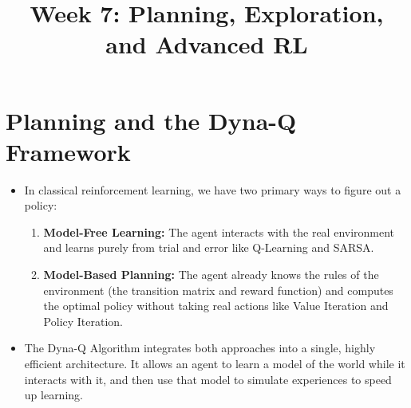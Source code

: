 \documentclass[12pt]{article}
\title{\textbf{Week 7: Planning, Exploration, and Advanced RL}}
\author{}
\date{}
\begin{document}
\maketitle

\vspace{0.5cm}

\section*{Planning and the Dyna-Q Framework}
\begin{itemize}[label=$\bullet$]
    \item In classical reinforcement learning, we have two primary ways to figure out a policy:
    \begin{enumerate}
        \item \textbf{Model-Free Learning:} The agent interacts with the real environment and learns purely from trial and error like Q-Learning and SARSA.
        \item \textbf{Model-Based Planning:} The agent already knows the rules of the environment (the transition matrix and reward function) and computes the optimal policy without taking real actions like Value Iteration and Policy Iteration.
    \end{enumerate}
    \item The Dyna-Q Algorithm integrates both approaches into a single, highly efficient architecture. It allows an agent to learn a model of the world while it interacts with it, and then use that model to simulate experiences to speed up learning.
\end{itemize}
\end{document}
